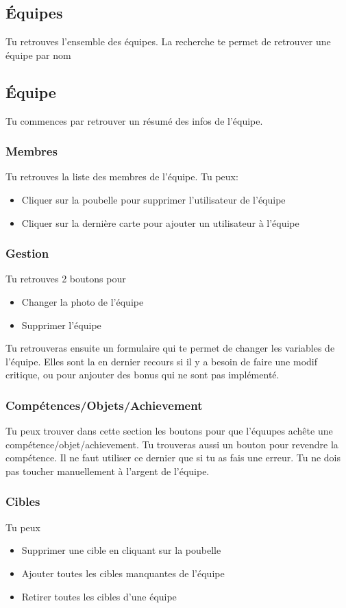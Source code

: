 \documentclass[12pt]{article}
\begin{document}
\subsection{Équipes}
Tu retrouves l'ensemble des équipes. La recherche te permet de retrouver une équipe par nom

\subsection{Équipe}
Tu commences par retrouver un résumé des infos de l'équipe.

\subsubsection{Membres}
Tu retrouves la liste des membres de l'équipe.
Tu peux:
\begin{itemize}
  \item Cliquer sur la poubelle pour supprimer l'utilisateur de l'équipe
  \item Cliquer sur la dernière carte pour ajouter un utilisateur à l'équipe
\end{itemize}

\subsubsection{Gestion}
Tu retrouves 2 boutons pour
\begin{itemize}
  \item Changer la photo de l'équipe
  \item Supprimer l'équipe
\end{itemize}

Tu retrouveras ensuite un formulaire qui te permet de changer les variables de l'équipe.
Elles sont la en dernier recours si il y a besoin de faire une modif critique, ou pour anjouter des bonus qui ne sont pas implémenté.


\subsubsection{Compétences/Objets/Achievement}
Tu peux trouver dans cette section les boutons pour que l'équupes achête une compétence/objet/achievement. Tu trouveras aussi un bouton pour revendre la compétence. Il ne faut utiliser ce dernier que si tu as fais une erreur. Tu ne dois pas toucher manuellement à l'argent de l'équipe.


\subsubsection{Cibles}
Tu peux
\begin{itemize}
  \item Supprimer une cible en cliquant sur la poubelle
  \item Ajouter toutes les cibles manquantes de l'équipe
  \item Retirer toutes les cibles d'une équipe
\end{itemize}
\end{document}
